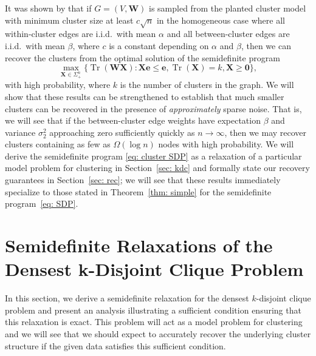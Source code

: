 \documentclass[twoside,11pt]{article}
\DeclareMathOperator{\tr}{{Tr}}
\newcommand{\e}{\bs {e}}
\newcommand{\bs}{\boldsymbol}
\newcommand{\X}{\bs {X}}
\newcommand{\W}{\bs {W}}
\newcommand{\0}{\bs{0}}
\newcommand{\ra}{\rightarrow}
\begin{document}
It was shown by \cite{ames2014guaranteed} that if \(G = (V, \W)\) is sampled
from the
planted cluster model
with minimum cluster
size at least \(c\sqrt{n}\) in the homogeneous
case where all within-cluster edges are i.i.d.~with mean $\alpha$
and all between-cluster edges are i.i.d.~with mean $\beta$, where \(c\) is a constant
depending on \(\alpha\) and \(\beta\), then we can recover the clusters
from the optimal solution of the semidefinite program
\begin{equation} \label{eq: cluster SDP}
\max_{\X \in \Sigma_+^n} \Big\{ \tr(\W \X): \X \e \le \e,
\tr(\X) = k, \X \ge \0 \Big\},
\end{equation}
with high probability, where \(k \) is the number of clusters in the graph.
We will show that these results can be strengthened to establish that much
smaller clusters can be recovered in the presence of \emph{approximately}
sparse noise. That is, we will
see that if the between-cluster edge weights have expectation
\(\beta\) and variance \(\sigma_2^2\) approaching zero  sufficiently quickly as \(n \ra \infty\), then we may recover
clusters containing as few as \(\Omega(\log n)\) nodes with high probability. %
We will derive the semidefinite program \eqref{eq: cluster SDP}
as a relaxation of a particular model problem for clustering in Section~\ref{sec: kdc}
and formally state our recovery guarantees  in Section~\ref{sec: rec};
we will see that these results immediately specialize to those stated in Theorem~\ref{thm: simple}
for the semidefinite program~\eqref{eq: SDP}.

\section{Semidefinite Relaxations of the Densest k-Disjoint Clique Problem}

In this section, we derive a semidefinite relaxation for the densest \(k\)-disjoint clique problem
and present an analysis illustrating a sufficient condition ensuring that this relaxation
is exact. This problem will act as a model problem for clustering and we will see that
we should expect
to accurately recover the underlying cluster structure if the given data
satisfies this sufficient condition.
\end{document}
